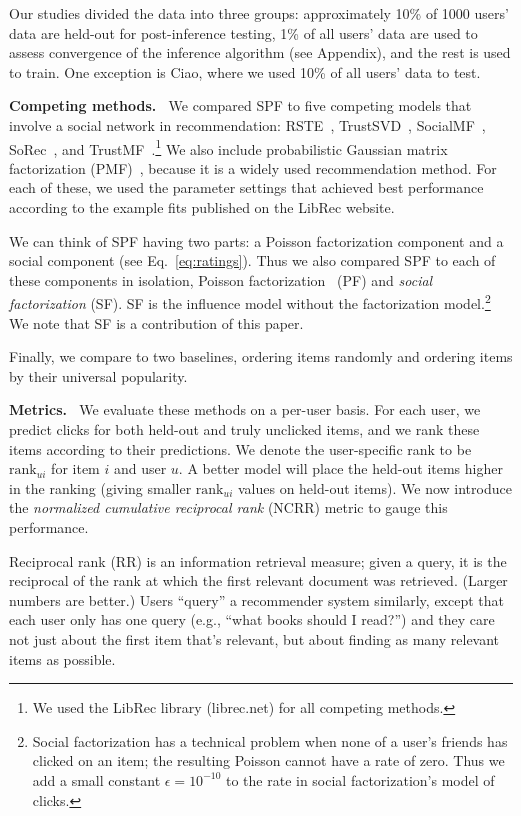 \documentclass{sig-alternate-2013}
\newcommand{\mypar}[1]{\vspace{0.05in} \noindent \textbf{#1 \,}}
\begin{document}
Our studies divided the data into three groups: approximately 10\% of
1000 users' data are held-out for post-inference testing, 1\% of all users' data
are used to assess convergence of the inference algorithm (see
Appendix), and the rest is used to train.  One exception is Ciao,
where we used 10\% of all users' data to test.

\mypar{Competing methods.}  We compared SPF to five competing models
that involve a social network in recommendation: RSTE~\cite{Ma:2009},
TrustSVD~\cite{guo2015trustsvd}, SocialMF~\cite{Jamali:2010},
SoRec~\cite{SoRec}, and TrustMF~\cite{Yang2013}.\footnote{We used the LibRec library
  (librec.net) for all competing methods.} We also include probabilistic Gaussian matrix
factorization (PMF)~\cite{PMF}, because it is a widely used
recommendation method.  For each of these, we used the parameter
settings that achieved best performance according to the example fits
published on the LibRec website.

We can think of SPF having two parts: a Poisson factorization
component and a social component (see Eq.~\ref{eq:ratings}).
Thus we also compared SPF to each of these components in isolation,
Poisson factorization~\cite{poisMF} (PF) and \textit{social
  factorization} (SF).  SF is the influence model without the
factorization model.\footnote{Social factorization has a technical
  problem when none of a user's friends has clicked on an item; the
  resulting Poisson cannot have a rate of zero. Thus we add a small
  constant $\epsilon=10^{-10}$ to the rate in social factorization's
  model of clicks.}  We note that SF is a contribution of this paper.

Finally, we compare to two baselines, ordering items randomly and
ordering items by their universal popularity.

\mypar{Metrics.}  We evaluate these methods on a per-user basis.  For
each user, we predict clicks for both held-out and truly unclicked
items, and we rank these items according to their predictions.  We
denote the user-specific rank to be $\textrm{rank}_{ui}$ for item $i$
and user $u$.  A better model will place the held-out items higher in
the ranking (giving smaller $\textrm{rank}_{ui}$ values on held-out
items).  We now introduce the \textit{normalized cumulative reciprocal
  rank} (NCRR) metric to gauge this performance.

Reciprocal rank (RR) is an information retrieval measure; given a
query, it is the reciprocal of the rank at which the first relevant
document was retrieved.  (Larger numbers are better.)  Users ``query''
a recommender system similarly, except that each user only has one
query (e.g., ``what books should I read?'') and they care not just
about the first item that's relevant, but about finding as many
relevant items as possible.
\end{document}

